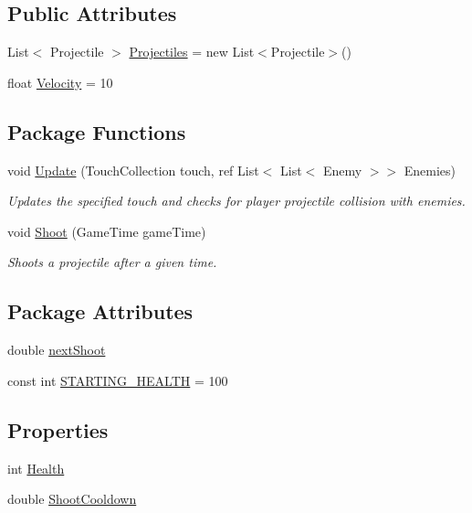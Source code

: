 \subsection*{Public Attributes}
\begin{DoxyCompactItemize}
\item 
List$<$ Projectile $>$ \hyperlink{classXaria_1_1Player_a643c5dbda599d86c01bde3cfd1749ae6}{Projectiles} = new List$<$Projectile$>$()
\item 
float \hyperlink{classXaria_1_1Player_ae6a69729c15af135388ead356e025b97}{Velocity} = 10
\end{DoxyCompactItemize}
\subsection*{Package Functions}
\begin{DoxyCompactItemize}
\item 
void \hyperlink{classXaria_1_1Player_adc33765b2f4761f7722299cc880f376f}{Update} (Touch\+Collection touch, ref List$<$ List$<$ Enemy $>$$>$ Enemies)
\begin{DoxyCompactList}\small\item\em Updates the specified touch and checks for player projectile collision with enemies. \end{DoxyCompactList}\item 
void \hyperlink{classXaria_1_1Player_a9449bb24ef3a669d4d8081c652811b7c}{Shoot} (Game\+Time game\+Time)
\begin{DoxyCompactList}\small\item\em Shoots a projectile after a given time. \end{DoxyCompactList}\end{DoxyCompactItemize}
\subsection*{Package Attributes}
\begin{DoxyCompactItemize}
\item 
double \hyperlink{classXaria_1_1Player_afdb434cf55e3817ee1f6949c0fb71ee3}{next\+Shoot}
\item 
const int \hyperlink{classXaria_1_1Player_a454099110fca2d19ae08bc7174802018}{S\+T\+A\+R\+T\+I\+N\+G\+\_\+\+H\+E\+A\+L\+TH} = 100
\end{DoxyCompactItemize}
\subsection*{Properties}
\begin{DoxyCompactItemize}
\item 
int \hyperlink{classXaria_1_1Player_a48a4972a17acb525adca1a30454eaf30}{Health}
\item 
double \hyperlink{classXaria_1_1Player_a0139bb987403bdbe4b795a03be8d2108}{Shoot\+Cooldown}
\end{DoxyCompactItemize}


